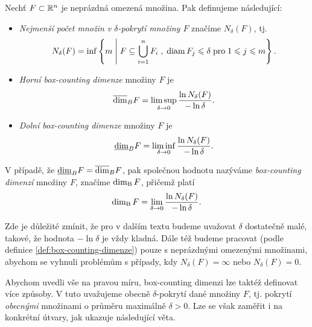 \begin{definition}\label{def:box-counting-dimenze}
    Nechť $F\subset \mathbb{R}^n$ je neprázdná omezená množina. Pak definujeme následující:
    \begin{itemize}
        \item \emph{Nejmenší počet množin v $\delta$-pokrytí množiny $F$} značíme $N_\delta(F)$, tj.
        \[N_\delta(F)=\inf\left\{m\;\middle|\;F\subseteq\bigcup_{i=1}^n F_i\;,\;\operatorname{diam}{F_j}\leqslant\delta\;\text{pro}\;1\leqslant j\leqslant m\right\}.\]
        \item \emph{Horní box-counting dimenze} množiny $F$ je
        \[\overline{\dim}_B{F}=\limsup_{\delta\to 0}\dfrac{\ln{N_\delta(F)}}{-\ln{\delta}}.\]
        \item \emph{Dolní box-counting dimenze} množiny $F$ je
        \[\underline{\dim}_B{F}=\liminf_{\delta\to 0}\dfrac{\ln{N_\delta(F)}}{-\ln{\delta}}.\]
    \end{itemize}
    V případě, že $\underline{\dim}_B{F}=\overline{\dim}_B{F}$, pak společnou hodnotu nazýváme \emph{box-counting dimenzí} množiny $F$, značíme $\operatorname{dim_B}{F}$, přičemž platí
    \[\operatorname{dim_B}{F}=\lim_{\delta\to 0}\dfrac{\ln{N_\delta(F)}}{-\ln{\delta}}.\]
\end{definition}
\begin{remark}
    Zde je důležité zmínit, že pro v dalším textu budeme uvažovat $\delta$ dostatečně malé, takové, že hodnota $-\ln{\delta}$ je vždy kladná. Dále též budeme pracovat (podle definice \ref{def:box-counting-dimenze}) pouze s neprázdnými omezenými množinami, abychom se vyhnuli problémům s případy, kdy $N_\delta(F)=\infty$ nebo $N_\delta(F)=0$.
\end{remark}
Abychom uvedli vše na pravou míru, box-counting dimenzi lze taktéž definovat více způsoby. V tuto uvažujeme obecně $\delta$-pokrytí dané množiny $F$, tj. pokrytí \emph{obecnými} množinami o průměru maximálně $\delta>0$. Lze se však zaměřit i na konkrétní útvary, jak ukazuje následující věta.
